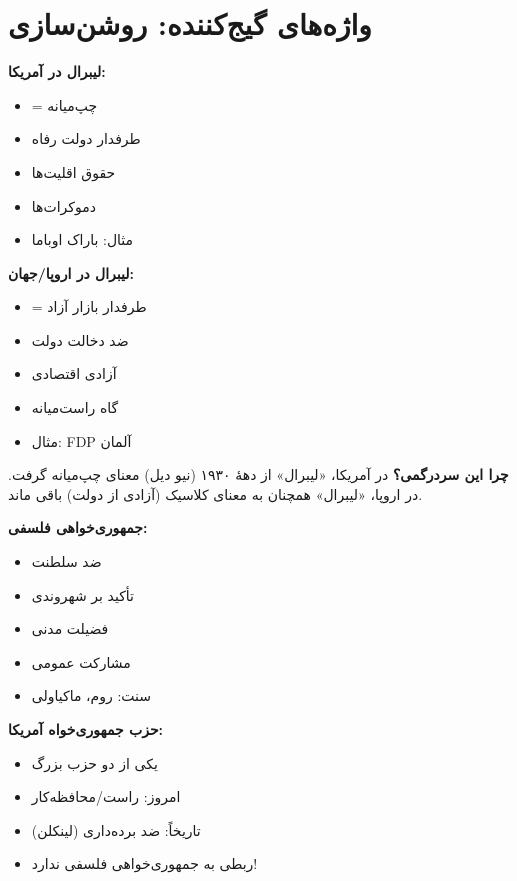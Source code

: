 \section*{واژه‌های گیج‌کننده: روشن‌سازی}

\begin{tcolorbox}[
    enhanced,
    colback=goldaccent!10,
    colframe=goldaccent,
    boxrule=1.5pt,
    arc=5pt,
    fonttitle=\bfseries,
    title={\rl{🟡 لیبرال: دو معنای متفاوت}}
]

\textbf{لیبرال در آمریکا:}
\begin{itemize}
    \item = چپ‌میانه
    \item طرفدار دولت رفاه
    \item حقوق اقلیت‌ها
    \item دموکرات‌ها
    \item مثال: باراک اوباما
\end{itemize}



\textbf{لیبرال در اروپا/جهان:}
\begin{itemize}
    \item = طرفدار بازار آزاد
    \item ضد دخالت دولت
    \item آزادی اقتصادی
    \item گاه راست‌میانه
    \item مثال: FDP آلمان
\end{itemize}


\textbf{چرا این سردرگمی؟} در آمریکا، «لیبرال» از دههٔ ۱۹۳۰ (نیو دیل) معنای چپ‌میانه گرفت. در اروپا، «لیبرال» همچنان به معنای کلاسیک (آزادی از دولت) باقی ماند.
\end{tcolorbox}

\begin{tcolorbox}[
    enhanced,
    colback=goldaccent!10,
    colframe=goldaccent,
    boxrule=1.5pt,
    arc=5pt,
    fonttitle=\bfseries,
    title={\rl{🟡 جمهوری‌خواه: دو معنا}}
]

\textbf{جمهوری‌خواهی فلسفی:}
\begin{itemize}
    \item ضد سلطنت
    \item تأکید بر شهروندی
    \item فضیلت مدنی
    \item مشارکت عمومی
    \item سنت: روم، ماکیاولی
\end{itemize}



\textbf{حزب جمهوری‌خواه آمریکا:}
\begin{itemize}
    \item یکی از دو حزب بزرگ
    \item امروز: راست/محافظه‌کار
    \item تاریخاً: ضد برده‌داری (لینکلن)
    \item ربطی به جمهوری‌خواهی فلسفی ندارد!
\end{itemize}

\end{tcolorbox}


